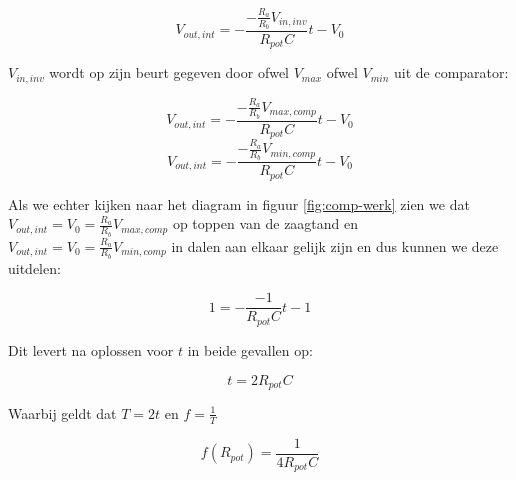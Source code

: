 \documentclass{report}
\begin{document}
$$V_{out,int} = -\frac{-\frac{R_{a}}{R_{b}}V_{in,inv}}{R_{pot}C} t - V_{0}$$

\noindent
$V_{in,inv}$ wordt op zijn beurt gegeven door ofwel $V_{max}$ ofwel $V_{min}$ uit de comparator:

$$V_{out,int} = -\frac{-\frac{R_{a}}{R_{b}}V_{max,comp}}{R_{pot}C} t - V_{0}$$
$$V_{out,int} = -\frac{-\frac{R_{a}}{R_{b}}V_{min,comp}}{R_{pot}C} t - V_{0}$$

\noindent
Als we echter kijken naar het diagram in figuur \ref{fig:comp-werk} zien we dat $V_{out,int} = V_{0} = \frac{R_{a}}{R_{b}}V_{max,comp}$ op toppen van de zaagtand en $V_{out,int} = V_{0} = \frac{R_{a}}{R_{b}}V_{min,comp}$ in dalen aan elkaar gelijk zijn en dus kunnen we deze uitdelen:

$$1 = -\frac{-1}{R_{pot}C} t - 1$$

\noindent
Dit levert na oplossen voor $t$ in beide gevallen op:

\begin{equation}
	t = 2R_{pot}C
\end{equation}

\noindent
Waarbij geldt dat $T=2t$ en $f=\frac{1}{T}$

\begin{equation}
\label{eq:freqOscillator}
	f(R_{pot}) = \frac{1}{4R_{pot}C}
\end{equation}
\end{document}
